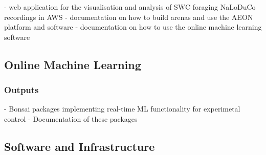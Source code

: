 \documentclass[12pt]{article}
\begin{document}
- web application for the visualisation and analysis of SWC foraging NaLoDuCo recordings in AWS
- documentation on how to build arenas and use the AEON platform and software
- documentation on how to use the online machine learning software

\subsection{Online Machine Learning}

\subsubsection{Outputs}

- Bonsai packages implementing real-time ML functionality for experimetal control
- Documentation of these packages

\subsection{Software and Infrastructure}
\end{document}
